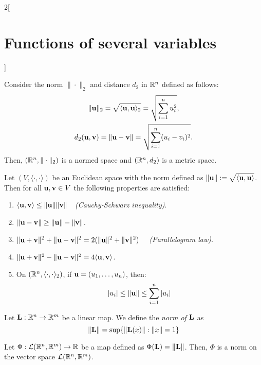 \documentclass[../../../main.tex]{subfiles}
\begin{document}
\begin{multicols}{2}[\section{Functions of several variables}]
\begin{prop}
  \end{prop}
  \begin{corollary}
    Consider the norm $\|\cdot\|_2$ and distance $d_2$ in $\mathbb{R}^n$ defined as follows:
    \begin{gather*}
      \|\boldsymbol{\mathrm{u}}\|_2=\sqrt{\langle \boldsymbol{\mathrm{u}},\boldsymbol{\mathrm{u}}\rangle_2}=\sqrt{\sum_{i=1}^nu_i^2},\\
      d_2(\boldsymbol{\mathrm{u}},\boldsymbol{\mathrm{v}})=\|\boldsymbol{\mathrm{u}}-\boldsymbol{\mathrm{v}}\|=\sqrt{\sum_{i=1}^n(u_i-v_i)^2}.
    \end{gather*}
    Then, $(\mathbb{R}^n,\|\cdot\|_2)$ is a normed space and $(\mathbb{R}^n,d_2)$ is a metric space.
  \end{corollary}
  \begin{prop}
    Let $(V,\langle\cdot,\cdot\rangle)$ be an Euclidean space with the norm defined as $\|\boldsymbol{\mathrm{u}}\|:=\sqrt{\langle \boldsymbol{\mathrm{u}},\boldsymbol{\mathrm{u}}\rangle}$. Then for all $\boldsymbol{\mathrm{u}},\boldsymbol{\mathrm{v}}\in V$ the following properties are satisfied:
    \begin{enumerate}
      \item $\langle \boldsymbol{\mathrm{u}},\boldsymbol{\mathrm{v}}\rangle\leq\|\boldsymbol{\mathrm{u}}\|\|\boldsymbol{\mathrm{v}}\|\quad$\textit{(Cauchy-Schwarz inequality)}.
      \item $\|\boldsymbol{\mathrm{u}}-\boldsymbol{\mathrm{v}}\|\geq\|\boldsymbol{\mathrm{u}}\|-\|\boldsymbol{\mathrm{v}}\|$.
      \item $\|\boldsymbol{\mathrm{u}}+\boldsymbol{\mathrm{v}}\|^2+\|\boldsymbol{\mathrm{u}}-\boldsymbol{\mathrm{v}}\|^2=2(\|\boldsymbol{\mathrm{u}}\|^2+\|\boldsymbol{\mathrm{v}}\|^2)\quad$ \textit{(Parallelogram law)}.
      \item $\|\boldsymbol{\mathrm{u}}+\boldsymbol{\mathrm{v}}\|^2-\|\boldsymbol{\mathrm{u}}-\boldsymbol{\mathrm{v}}\|^2=4\langle \boldsymbol{\mathrm{u}},\boldsymbol{\mathrm{v}}\rangle$.
      \item On $(\mathbb{R}^n,\langle\cdot,\cdot\rangle_2)$, if $\boldsymbol{\mathrm{u}}=(u_1,\ldots,u_n)$, then: $$|u_i|\leq\|\boldsymbol{\mathrm{u}}\|\leq\sum_{i=1}^n|u_i|$$
    \end{enumerate}
  \end{prop}
  \begin{definition}
    Let $\boldsymbol{\mathrm{L}}:\mathbb{R}^n\rightarrow\mathbb{R}^m$ be a linear map. We define the \textit{norm of $\boldsymbol{\mathrm{L}}$} as $$\|\boldsymbol{\mathrm{L}}\|=\sup\{\|\boldsymbol{\mathrm{L}}(x)\|:\|x\|=1\}$$
  \end{definition}
  \begin{lemma}
    Let $\Phi:\mathcal{L}(\mathbb{R}^n,\mathbb{R}^m)\rightarrow\mathbb{R} $ be a map defined as $\Phi(\boldsymbol{\mathrm{L}})=\|\boldsymbol{\mathrm{L}}\|$. Then, $\Phi$ is a norm on the vector space $\mathcal{L}(\mathbb{R}^n,\mathbb{R}^m)$.

\end{lemma}
\end{multicols}
\end{document}
